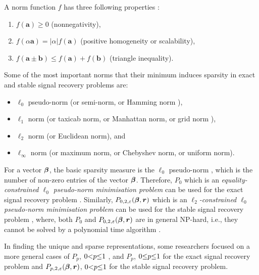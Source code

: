 A norm function $f$ has three following properties \cite{Golub2013,Walter2014}:
\begin{enumerate}
\item $f(\boldsymbol{a}) \geq 0$ (nonnegativity),
\item $f(\alpha \boldsymbol{a}) = \vert \alpha \vert f(\boldsymbol{a})$ (positive homogeneity or scalability),
\item $f(\boldsymbol{a} \pm \boldsymbol{b}) \leq f(\boldsymbol{a}) + f(\boldsymbol{b})$ (triangle inequality).
\end{enumerate}
Some of the most important norms that their minimum induces sparsity in exact and stable signal recovery problems are:
\begin{itemize}
\item $\ell_0$ pseudo-norm (or semi-norm, or Hamming norm \cite{Hurley2009}),
\item $\ell_1$ norm (or taxicab norm, or Manhattan norm, or grid norm \cite{Walter2014}),
\item $\ell_2$ norm (or Euclidean norm), and%
\item $\ell_\infty$ norm (or maximum norm, or Chebyshev norm, or uniform norm).
\end{itemize}



For a vector $\boldsymbol{\beta}$, the basic sparsity measure is the $\ell_0$ pseudo-norm \cite{Hurley2009}, which is the number of non-zero entries of the vector $\boldsymbol{\beta}$. 
Therefore, $P_0$ which is an \emph{equality-constrained $\ell_0$ pseudo-norm minimisation problem} can be used for the exact signal recovery problem \cite{Cand`es2005b}.
Similarly, $P_{0,2,\varepsilon}(\boldsymbol{\beta},\boldsymbol{r})$ which is an \emph{$\ell_2$-constrained $\ell_0$ pseudo-norm minimisation problem} can be used for the stable signal recovery problem \cite{Donoho2006a}, where, both $P_0$ and $P_{0,2,\varepsilon}(\boldsymbol{\beta},\boldsymbol{r})$ are in general NP-hard, i.e., they  cannot be solved by a polynomial time algorithm \cite{Natarajan1995,Amaldi1998}.

In finding the unique and sparse representations, some researchers focused on a more general cases of $P_p$, $0 {<} p {\leq} 1$ \cite{Chartrand2007,Davies2008,Foucart2009a,Davies2009}, and $P_p$, $0 {\leq} p {\leq} 1$ \cite{Gribonval2003a,Gribonval2004a,Gribonval2007} for the exact signal recovery problem and $P_{p,2,\varepsilon}(\boldsymbol{\beta},\boldsymbol{r})$, $0 {<} p {\leq} 1$ \cite{Foucart2009a} for the stable signal recovery problem.

